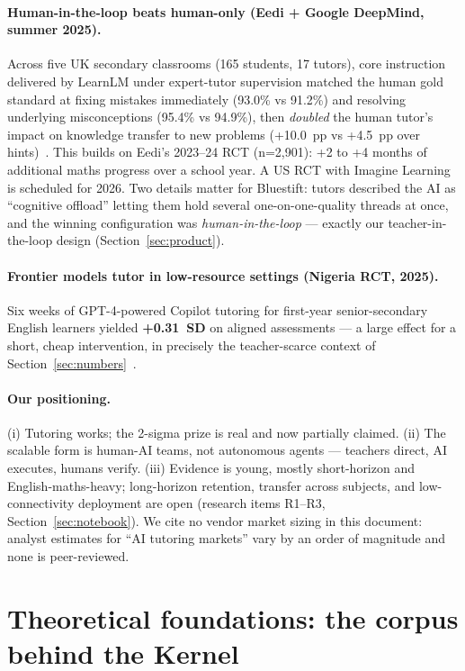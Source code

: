 \documentclass[11pt,a4paper]{article}
\let\oldsection\section
\renewcommand{\section}{\clearpage\oldsection}
\begin{document}
\paragraph{Human-in-the-loop beats human-only (Eedi + Google DeepMind, summer
2025).} Across five UK secondary classrooms (165 students, 17 tutors), core
instruction delivered by LearnLM under expert-tutor supervision matched the
human gold standard at fixing mistakes immediately (93.0\% vs 91.2\%) and
resolving underlying misconceptions (95.4\% vs 94.9\%), then \emph{doubled} the
human tutor's impact on knowledge transfer to new problems (+10.0~pp vs
+4.5~pp over hints)~\cite{eedi-learnlm-2025}. This builds on Eedi's 2023--24
RCT (n=2{,}901): +2 to +4 months of additional maths progress over a school
year. A US RCT with Imagine Learning is scheduled for 2026. Two details matter
for Bluestift: tutors described the AI as ``cognitive offload'' letting them
hold several one-on-one-quality threads at once, and the winning configuration
was \emph{human-in-the-loop} --- exactly our teacher-in-the-loop design
(Section~\ref{sec:product}).

\paragraph{Frontier models tutor in low-resource settings (Nigeria RCT, 2025).}
Six weeks of GPT-4-powered Copilot tutoring for first-year senior-secondary
English learners yielded \textbf{+0.31~SD} on aligned assessments ---
a large effect for a short, cheap intervention, in precisely the
teacher-scarce context of Section~\ref{sec:numbers}~\cite{nigeria-2025}.

\paragraph{Our positioning.} (i) Tutoring works; the 2-sigma prize is real and
now partially claimed. (ii) The scalable form is human-AI teams, not
autonomous agents --- teachers direct, AI executes, humans verify. (iii)
Evidence is young, mostly short-horizon and English-maths-heavy; long-horizon
retention, transfer across subjects, and low-connectivity deployment are open
(research items R1--R3, Section~\ref{sec:notebook}). We cite no vendor market
sizing in this document: analyst estimates for ``AI tutoring markets'' vary by
an order of magnitude and none is peer-reviewed.

\section{Theoretical foundations: the corpus behind the Kernel}
\label{sec:foundations}
\end{document}
